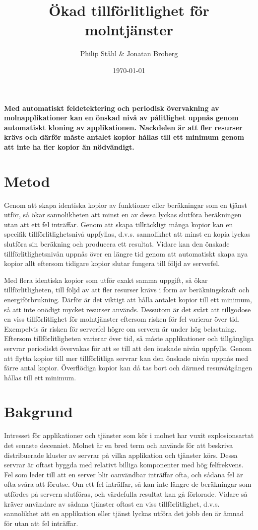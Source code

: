 \documentclass{article}
\author{
	Philip Ståhl \& Jonatan Broberg
}
\title{Ökad tillförlitlighet för molntjänster}
\date{\today}
\begin{document}
\maketitle

\begin{multicols}{2}
\noindent
\textbf{Med automatiskt feldetektering och periodisk övervakning av molnapplikationer kan en önskad nivå av pålitlighet uppnås genom automatiskt kloning av applikationen. Nackdelen är att fler resurser krävs och därför måste antalet kopior hållas till ett minimum genom att inte ha fler kopior än nödvändigt.}

\section*{Metod}
Genom att skapa identiska kopior av funktioner eller beräkningar som en tjänst utför, så ökar sannolikheten att minst en av dessa lyckas slutföra beräkningen utan att ett fel inträffar. Genom att skapa tillräckligt många kopior kan en specifik tillförlitlighetsnivå uppfyllas, d.v.s. sannolikhet att minst en kopia lyckas slutföra sin beräkning och producera ett resultat. Vidare kan den önskade tillförlitlighetsnivån uppnås över en längre tid genom att automatiskt skapa nya kopior allt eftersom tidigare kopior slutar fungera till följd av serverfel.

Med flera identiska kopior som utför exakt samma uppgift, så ökar tillförlitligheten, till följd av att fler resurser krävs i form av beräkningskraft och energiförbrukning. Därför är det viktigt att hålla antalet kopior till ett minimum, så att inte onödigt mycket resurser används. Dessutom är det svårt att tillgodose en viss tillförlitlighet för molntjänster eftersom risken för fel varierar över tid. Exempelvis är risken för serverfel högre om servern är under hög belastning. Eftersom tillförlitligheten varierar över tid, så måste applikationer och tillgängliga servrar periodiskt övervakas för att se till att den önskade nivån uppfylls. Genom att flytta kopior till mer tillförlitliga servrar kan den önskade nivån uppnås med färre antal kopior. Överflödiga kopior kan då tas bort och därmed resursåtgången hållas till ett minimum.

\section*{Bakgrund}
Intresset för applikationer och tjänster som kör i molnet har vuxit explosionsartat det senaste decenniet. Molnet är en bred term och används för att beskriva distribuerade kluster av servrar på vilka applikation och tjänster körs. Dessa servrar är oftast byggda med relativt billiga komponenter med hög felfrekvens. Fel som leder till att en server blir oanvändbar inträffar ofta, och sådana fel är ofta svåra att förutse. Om ett fel inträffar, så kan inte längre de beräkningar som utfördes på servern slutföras, och värdefulla resultat kan gå förlorade. Vidare så kräver användare av sådana tjänster oftast en viss tillförlitlighet, d.v.s. sannolikhet att en applikation eller tjänst lyckas utföra det jobb den är ämnad för utan att fel inträffar. 


\end{multicols}
\end{document}
